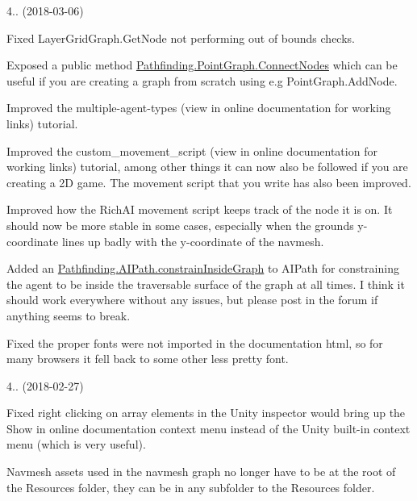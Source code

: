 \begin{DoxyItemize}
\begin{DoxyItemize}
\end{DoxyItemize}
\item 4.. (2018-\/03-\/06)
\begin{DoxyItemize}
\item Fixed Layer\+Grid\+Graph.\+Get\+Node not performing out of bounds checks.
\item Exposed a public method \mbox{\hyperlink{class_pathfinding_1_1_point_graph_a196e172067978f857152b90702c53579}{Pathfinding.\+Point\+Graph.\+Connect\+Nodes}} which can be useful if you are creating a graph from scratch using e.\+g Point\+Graph.\+Add\+Node.
\item Improved the multiple-\/agent-\/types (view in online documentation for working links) tutorial.
\item Improved the custom\+\_\+movement\+\_\+script (view in online documentation for working links) tutorial, among other things it can now also be followed if you are creating a 2D game. The movement script that you write has also been improved.
\item Improved how the Rich\+AI movement script keeps track of the node it is on. It should now be more stable in some cases, especially when the ground\textquotesingle{}s y-\/coordinate lines up badly with the y-\/coordinate of the navmesh.
\item Added an \mbox{\hyperlink{class_pathfinding_1_1_a_i_path_a3a74e67c2f867f062595c26a804dc573}{Pathfinding.\+A\+I\+Path.\+constrain\+Inside\+Graph}} to A\+I\+Path for constraining the agent to be inside the traversable surface of the graph at all times. I think it should work everywhere without any issues, but please post in the forum if anything seems to break.
\item Fixed the proper fonts were not imported in the documentation html, so for many browsers it fell back to some other less pretty font.
\end{DoxyItemize}
\item 4.. (2018-\/02-\/27)
\begin{DoxyItemize}
\item Fixed right clicking on array elements in the Unity inspector would bring up the \textquotesingle{}Show in online documentation\textquotesingle{} context menu instead of the Unity built-\/in context menu (which is very useful).
\item Navmesh assets used in the navmesh graph no longer have to be at the root of the Resources folder, they can be in any subfolder to the Resources folder.
\end{DoxyItemize}

\end{DoxyItemize}
